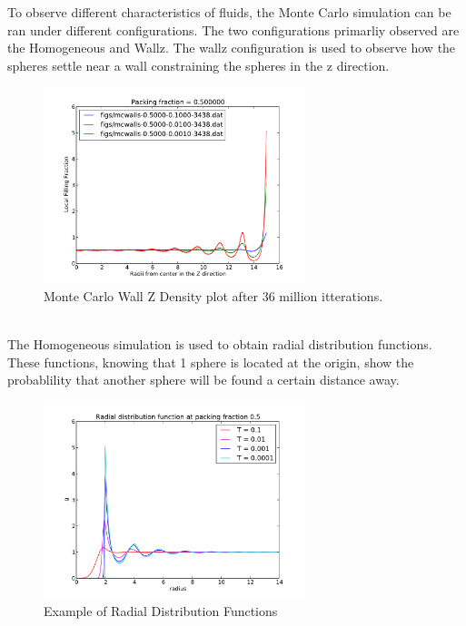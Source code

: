 \documentclass[a4paper,12pt]{article}
\begin{document}
To observe different characteristics of fluids, the Monte Carlo simulation can be ran under different configurations.  The two configurations primarliy observed are the Homogeneous and Wallz.
The wallz configuration is used to observe how the spheres settle near a wall constraining the spheres in the z direction.
\begin{figure}[h]
\centering
\includegraphics[width=3in]{walls-50.pdf}
\caption{Monte Carlo Wall Z Density plot after 36 million itterations.}
\end{figure}\\
The Homogeneous simulation is used to obtain radial distribution functions.  These functions, knowing that 1 sphere is located at the origin, show the probablility that another sphere will be found a certain distance away.
\begin{figure}[h]
\centering
\includegraphics[width=3in]{radial-distribution-50.pdf}
\caption{Example of Radial Distribution Functions}
\end{figure}\\
\end{document}
